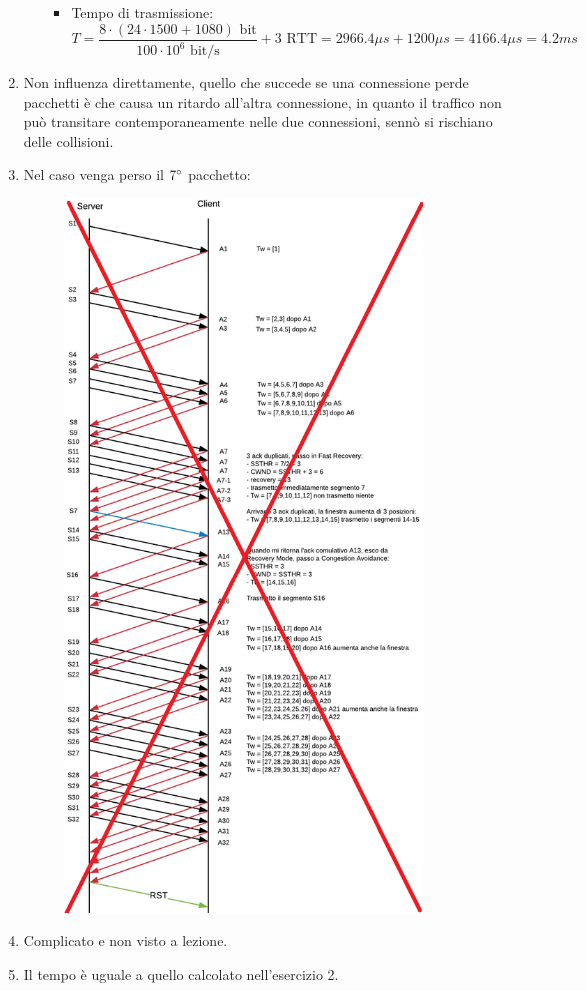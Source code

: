 \documentclass[10pt,a4paper]{article}
\begin{document}
\begin{enumerate}
\begin{itemize}
\begin{itemize}
\begin{figure}[H]
				\end{figure}
				\item Tempo di trasmissione:
				$$T = \frac{8 \cdot (24 \cdot 1500 + 1080) \textrm{ bit}}{ 100 \cdot 10^6 \textrm{ bit/s}} + 3 \textrm{ RTT} = 2966.4 \mu s + 1200 \mu s = 4166.4 \mu s = 4.2 ms$$
			\end{itemize}
		\end{itemize}
		\item Non influenza direttamente, quello che succede se una connessione perde pacchetti è che causa un ritardo all'altra connessione, in quanto il traffico non può transitare contemporaneamente nelle due connessioni, sennò si rischiano delle collisioni.
		\item Nel caso venga perso il $7 \degree$ pacchetto:
			\begin{figure}[H]
				\centering
				\includegraphics[width=9.5cm]{Esame1112019_Conperdite}
			\end{figure}
		\item Complicato e non visto a lezione.
		\item Il tempo è uguale a quello calcolato nell'esercizio 2.
	\end{enumerate}
\end{document}
